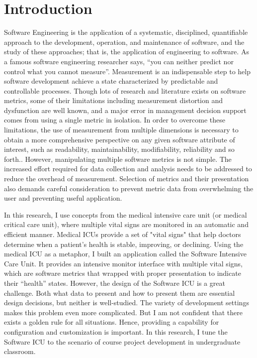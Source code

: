 
\chapter{Introduction}
Software Engineering is the application of a systematic, disciplined, quantifiable approach to the development, operation, and maintenance of software, and the study of these approaches; that is, the application of engineering to software\cite{se-def}. As a famous software engineering researcher says, ``you can neither predict nor control what you cannot measure''\cite{DeMarco}. Measurement is an indispensable step to help software development achieve a state characterized by predictable and controllable processes. Though lots of research and literature exists on software metrics, some of their limitations including measurement distortion and dysfunction are well known, and a major error in management decision support comes from using a single metric in isolation. In order to overcome these limitations, the use of measurement from multiple dimensions is necessary to obtain a more comprehensive perspective on any given software attribute of interest, such as readability, maintainability, modifiability, reliability and so forth.\cite{metrics2004}\cite{multidimension2001}. However, manipulating multiple software metrics is not simple. The increased effort required for data collection and analysis needs to be addressed to reduce the overhead of measurement. Selection of metrics and their presentation also demands careful consideration to prevent metric data from overwhelming the user and preventing useful application. 

In this research, I use concepts from the medical intensive care unit (or medical critical care unit), where multiple vital signs are monitored in an automatic and efficient manner. Medical ICUs provide a set of "vital signs" that help doctors determine when a patient's health is stable, improving, or declining. Using the medical ICU as a metaphor, I built an application called the Software Intensive Care Unit. It provides an intensive monitor interface with multiple vital signs, which are software metrics that wrapped with proper presentation to indicate their ``health'' states. However, the design of the Software ICU is a great challenge. Both what data to present and how to present them are essential design decisions, but neither is well-studied. The variety of development settings makes this problem even more complicated. But I am not confident that there exists a golden rule for all situations. Hence, providing a capability for configuration and customization is important. In this research, I tune the Software ICU to the scenario of course project development in undergraduate classroom.


